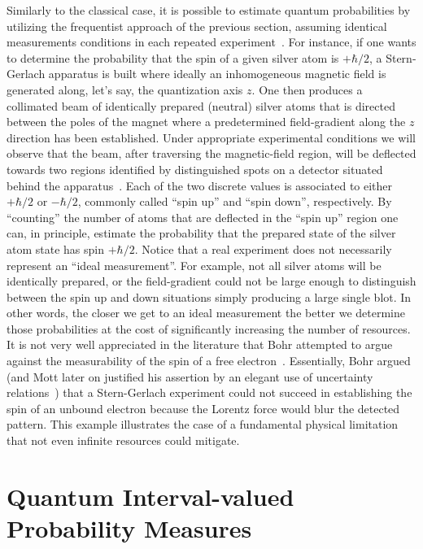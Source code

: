\documentclass[12pt]{iopart}
\theoremstyle{remark}
\begin{document}
Similarly to the classical case, it is possible to estimate quantum
probabilities by utilizing the frequentist approach of the previous
section, assuming identical measurements conditions in each repeated
experiment~\cite{peres1995quantum}. For instance, if one wants to
determine the probability that the spin of a given silver atom is
$+\hbar/2$, a Stern-Gerlach apparatus is built where ideally an inhomogeneous
magnetic field is generated along, let's say, the quantization axis
$z$. One then produces a collimated beam of identically prepared
(neutral) silver atoms that is directed between the poles of the magnet
where a predetermined field-gradient along the $z$ direction has
been established. Under appropriate experimental conditions we will
observe that the beam, after traversing the magnetic-field region,
will be deflected towards two regions identified by distinguished
spots on a detector situated behind the apparatus~\cite{Stern1988,peres1995quantum,544199,Griffiths2003}.
Each of the two discrete values is associated to either $+\hbar/2$
or $-\hbar/2$, commonly called ``spin up'' and ``spin down'',
respectively. By ``counting'' the number of atoms that are deflected
in the ``spin up'' region one can, in principle, estimate the probability
that the prepared state of the silver atom state has spin $+\hbar/2$.
Notice that a real experiment does not necessarily represent an ``ideal
measurement''. For example, not all silver atoms will be identically
prepared, or the field-gradient could not be large enough to distinguish
between the spin up and down situations simply producing a large single
blot. In other words, the closer we get to an ideal measurement the
better we determine those probabilities at the cost of significantly
increasing the number of resources. It is not very well appreciated
in the literature that Bohr attempted to argue against the measurability
of the spin of a free electron~\cite{Bohr1985,MartensDeMuynck1994,McEvoy2001}.
Essentially, Bohr argued (and Mott later on justified his assertion
by an elegant use of uncertainty relations~\cite{10.2307/j.ctt7ztxn5.15})
that a Stern-Gerlach experiment could not succeed in establishing
the spin of an unbound electron because the Lorentz force would blur
the detected pattern. This example illustrates the case of a fundamental
physical limitation that not even infinite resources could mitigate.

\section{Quantum Interval-valued Probability Measures}
 
\end{document}
